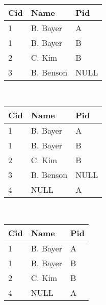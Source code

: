 \begin{itemize}
    
    \smallskip
    \begin{minipage}[t]{0.3\textwidth}
        \begin{center}
        \\
        \begin{tabular}{|l|l|l|}
        \hline
        Cid & Name & Pid \\
        \hline
        \hline
        1 & B. Bayer & A \\
        \hline
        1 & B. Bayer & B \\
        \hline
        2 & C. Kim & B \\
        \hline
        3 & B. Benson & NULL \\
        \hline
        \end{tabular}
        \end{center}
    \end{minipage}
    \begin{minipage}[t]{0.3\textwidth}
        \begin{center}
        \\
        \begin{tabular}{|l|l|l|}
        \hline
        Cid & Name & Pid \\
        \hline
        \hline
        1 & B. Bayer & A \\
        \hline
        1 & B. Bayer & B \\
        \hline
        2 & C. Kim & B \\
        \hline
        3 & B. Benson & NULL \\
        \hline
        4 & NULL & A \\
        \hline
        \end{tabular}
        \end{center}
    \end{minipage}
    \begin{minipage}[t]{0.3\textwidth}
        \begin{center}
        \\
        \begin{tabular}{|l|l|l|}
        \hline
        Cid & Name & Pid \\
        \hline
        \hline
        1 & B. Bayer & A \\
        \hline
        1 & B. Bayer & B \\
        \hline
        2 & C. Kim & B \\
        \hline
        4 & NULL & A \\
        \hline
        \end{tabular}
        \end{center}
    \end{minipage}
\end{itemize}

